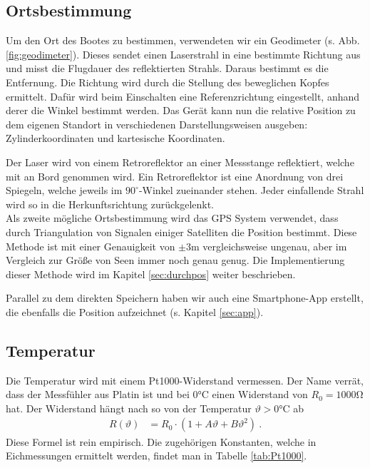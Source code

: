 \documentclass[12pt,a4paper,titlepage,headinclude,bibtotoc]{scrartcl}
\numberwithin{equation}{subsection}
\begin{document}
\subsection{Ortsbestimmung}
\label{sec:theoort}
Um den Ort des Bootes zu bestimmen, verwendeten wir ein Geodimeter (s. Abb. \ref{fig:geodimeter}).
Dieses sendet einen Laserstrahl in eine bestimmte Richtung aus und misst die Flugdauer des reflektierten Strahls.
Daraus bestimmt es die Entfernung.
Die Richtung wird durch die Stellung des beweglichen Kopfes ermittelt.
Dafür wird beim Einschalten eine Referenzrichtung eingestellt, anhand derer die Winkel bestimmt werden.
Das Gerät kann nun die relative Position zu dem eigenen Standort in verschiedenen Darstellungsweisen ausgeben: Zylinderkoordinaten und kartesische Koordinaten.

Der Laser wird von einem Retroreflektor an einer Messstange reflektiert, welche mit an Bord genommen wird.
Ein Retroreflektor ist eine Anordnung von drei Spiegeln, welche jeweils im $90^\circ$-Winkel zueinander stehen.
Jeder einfallende Strahl wird so in die Herkunftsrichtung zurückgelenkt.\\
Als zweite mögliche Ortsbestimmung wird das GPS System verwendet, dass durch Triangulation von Signalen einiger Satelliten die Position bestimmt.
Diese Methode ist mit einer Genauigkeit von $\pm3\si{\meter}$ vergleichsweise ungenau, aber im Vergleich zur Größe von Seen immer noch genau genug.
Die Implementierung dieser Methode wird im Kapitel \ref{sec:durchpos} weiter beschrieben.

Parallel zu dem direkten Speichern haben wir auch eine Smartphone-App erstellt, die ebenfalls die Position aufzeichnet (s. Kapitel \ref{sec:app}).


\subsection{Temperatur}
Die Temperatur wird mit einem Pt1000-Widerstand vermessen.
Der Name verrät, dass der Messfühler aus Platin ist und bei $0\si{\celsius}$ einen Widerstand von $R_0=1000\si{\ohm}$ hat.
Der Widerstand hängt nach \cite{Pt1000} so von der Temperatur $\vartheta>0\si{\celsius}$ ab
\begin{align}
	R(\vartheta)&=R_0\cdot\left(1 + A\vartheta + B\vartheta^2\right)~. \label{eq:Pt1000}
\end{align}
Diese Formel ist rein empirisch. 
Die zugehörigen Konstanten, welche in Eichmessungen ermittelt werden, findet man in Tabelle \ref{tab:Pt1000}.
\end{document}
